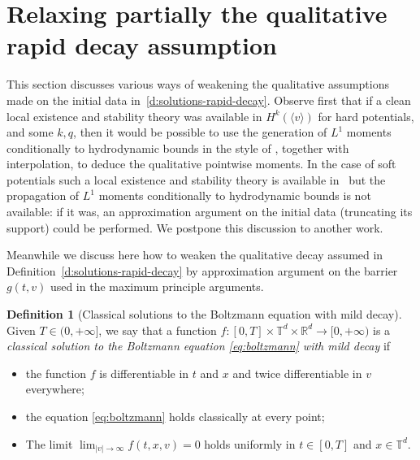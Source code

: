 \documentclass[JEP,XML,SOM,Unicode,NoFloatCountersInSection]{cedram}
\theoremstyle{plain}
\theoremstyle{definition}
\newtheorem{defn}[thm]{Definition}
\numberwithin{equation}{section}
\newcommand{\R}{\mathbb R}
\begin{document}
\section{Relaxing partially the qualitative rapid decay assumption}
\label{s:no-decay}

This section discusses various ways of weakening the qualitative
assumptions made on the initial data
in~\ref{d:solutions-rapid-decay}. Observe first that if a clean local
existence and stability theory was available in
$H^{k}(\langle v \rangle)$ for hard potentials, and some $k,q$, then
it would be possible to use the generation of $L^1$ moments
conditionally to hydrodynamic bounds in the style of
\cite[\S 5.3.1]{GMM}, together with interpolation, to deduce
the qualitative pointwise moments. In the case of soft potentials such
a local existence and stability theory is available
in~\cite{MR3376931} but the propagation of $L^1$ moments conditionally
to hydrodynamic bounds is not available: if it was, an approximation
argument on the initial data (truncating its support) could be
performed. We postpone this discussion to another work.

Meanwhile we discuss here how to weaken the qualitative decay assumed
in Definition~\ref{d:solutions-rapid-decay} by approximation argument
on the barrier $g(t,v)$ used in the maximum principle arguments.


\begin{defn}[Classical solutions to the Boltzmann equation with mild
decay] \label{d:solutions-no-decay} Given $T \in (0,+\infty]$, we
say that a function
$f : [0,T] \times \mathbb T^d \times \R^d \to [0,+\infty)$ is a
\emph{classical solution to the Boltzmann equation
\eqref{eq:boltzmann} with mild decay} if
\begin{itemize}
\item the function $f$ is differentiable in $t$ and $x$ and twice
differentiable in $v$ everywhere;
\item the equation \eqref{eq:boltzmann} holds classically at every
point;
\item The limit $\lim_{|v| \to \infty} f(t,x,v) = 0$ holds uniformly
in $t \in [0,T]$ and $x \in \mathbb{T}^d$.
\end{itemize}
\end{defn}
\end{document}
